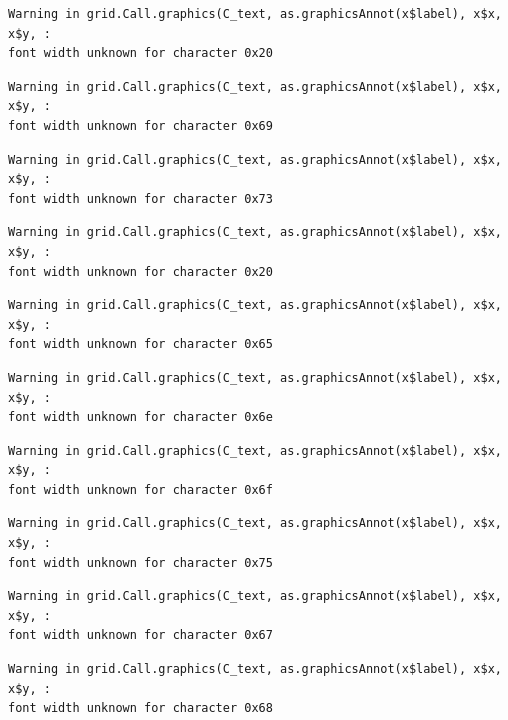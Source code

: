 \documentclass[
  letterpaper,
]{scrbook}
\begin{document}
\begin{verbatim}
Warning in grid.Call.graphics(C_text, as.graphicsAnnot(x$label), x$x, x$y, :
font width unknown for character 0x20
\end{verbatim}

\begin{verbatim}
Warning in grid.Call.graphics(C_text, as.graphicsAnnot(x$label), x$x, x$y, :
font width unknown for character 0x69
\end{verbatim}

\begin{verbatim}
Warning in grid.Call.graphics(C_text, as.graphicsAnnot(x$label), x$x, x$y, :
font width unknown for character 0x73
\end{verbatim}

\begin{verbatim}
Warning in grid.Call.graphics(C_text, as.graphicsAnnot(x$label), x$x, x$y, :
font width unknown for character 0x20
\end{verbatim}

\begin{verbatim}
Warning in grid.Call.graphics(C_text, as.graphicsAnnot(x$label), x$x, x$y, :
font width unknown for character 0x65
\end{verbatim}

\begin{verbatim}
Warning in grid.Call.graphics(C_text, as.graphicsAnnot(x$label), x$x, x$y, :
font width unknown for character 0x6e
\end{verbatim}

\begin{verbatim}
Warning in grid.Call.graphics(C_text, as.graphicsAnnot(x$label), x$x, x$y, :
font width unknown for character 0x6f
\end{verbatim}

\begin{verbatim}
Warning in grid.Call.graphics(C_text, as.graphicsAnnot(x$label), x$x, x$y, :
font width unknown for character 0x75
\end{verbatim}

\begin{verbatim}
Warning in grid.Call.graphics(C_text, as.graphicsAnnot(x$label), x$x, x$y, :
font width unknown for character 0x67
\end{verbatim}

\begin{verbatim}
Warning in grid.Call.graphics(C_text, as.graphicsAnnot(x$label), x$x, x$y, :
font width unknown for character 0x68
\end{verbatim}
\end{document}
